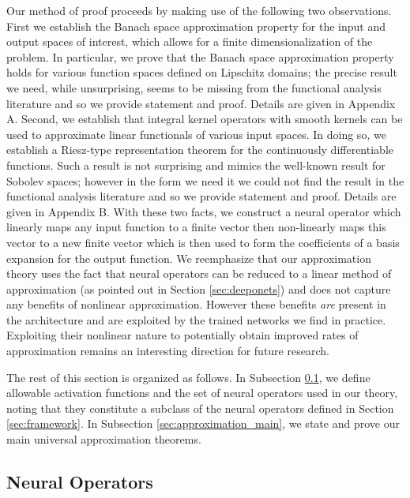 Our method of proof proceeds by making use of the following two observations.
First we establish the Banach space approximation property 
\cite{grothendieck1955produits} for the input and output spaces of interest, which allows for a finite dimensionalization of the problem. In particular, we prove that the
Banach space approximation property holds for various function spaces defined on Lipschitz domains; the precise result we need, while unsurprising, seems to be missing from the functional analysis literature and so we provide statement
and proof. Details are given in Appendix A. Second, we establish that integral kernel operators with smooth kernels can be used to approximate linear functionals of various input spaces. In doing so, we establish a Riesz-type representation theorem for the continuously differentiable functions. Such a result is not surprising and mimics the well-known result for Sobolev spaces; however in the form we need it we could not find the
result in the functional analysis literature and so we provide statement
and proof. Details are given in Appendix B. With these two facts, we construct a neural operator which linearly maps any input function to a finite vector then non-linearly maps this vector to a new finite vector which is then used to form the coefficients of a basis expansion for the output function. We reemphasize that our approximation theory uses the fact that neural operators can be reduced to a linear method of approximation (as pointed out in Section \ref{sec:deeponets}) and does not capture
any benefits of nonlinear approximation. However these benefits \emph{are} present in the architecture and are exploited by the trained networks we find in practice.
Exploiting their nonlinear nature to potentially obtain improved rates of approximation remains an interesting direction for future research.

The rest of this section is organized as follows. 
In Subsection \ref{sec:approximation_nos}, we define allowable activation functions and the set of neural operators used in our theory, noting that they constitute a subclass of the neural operators defined in Section \ref{sec:framework}.
In Subsection \ref{sec:approximation_main}, we state and prove our main universal approximation theorems.



\subsection{Neural Operators}
\label{sec:approximation_nos}

